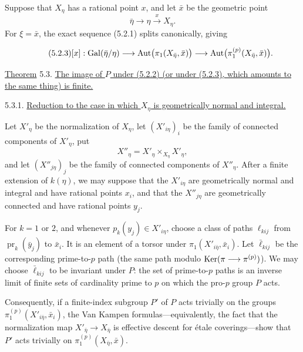 Suppose that $X_\eta$ has a rational point $x$, and let $\bar x$ be the
geometric point
\[
\bar\eta\longrightarrow\eta\xrightarrow{\ x\ }X_\eta.
\]
For $\xi=\bar x$, the exact sequence (5.2.1) splits canonically, giving


\begin{equation}\tag{5.2.3}
[x]:\operatorname{Gal}(\bar\eta/\eta)
\longrightarrow\operatorname{Aut}\bigl(\pi_1(X_{\bar\eta},\bar x)\bigr)
\longrightarrow\operatorname{Aut}\bigl(\pi_1^{(p)}(X_{\bar\eta},\bar x)\bigr).
\end{equation}

\underline{Theorem} 5.3. \underline{The image of $P$ under (5.2.2)
(or under (5.2.3), which amounts to the same thing) is finite.}

5.3.1. \underline{Reduction to the case in which $X_\eta$ is
geometrically normal and integral.}

Let $X'_\eta$ be the normalization of $X_\eta$, let
$(X'_{i\eta})_i$ be the family of connected components of $X'_\eta$,
put
\[
X''_\eta=X'_\eta\times_{X_\eta}X'_\eta,
\]
and let $(X''_{j\eta})_j$ be the family of connected components of
$X''_\eta$. After a finite extension of $k(\eta)$, we may suppose that
the $X'_{i\eta}$ are geometrically normal and integral and have rational
points $x_i$, and that the $X''_{j\eta}$ are geometrically connected and
have rational points $y_j$.

For $k=1$ or $2$, and whenever $p_k(y_j)\in X'_{i\eta}$, choose a class
of paths $\ell_{kij}$ from $\operatorname{pr}_k(\bar y_j)$ to $\bar x_i$.
It is an element of a torsor under
$\pi_1(X'_{i\bar\eta},\bar x_i)$. Let $\bar\ell_{kij}$ be the
corresponding prime-to-$p$ path (the same path modulo
$\operatorname{Ker}(\pi\longrightarrow\pi^{(p)})$). We may choose
$\bar\ell_{kij}$ to be invariant under $P$: the set of prime-to-$p$
paths is an inverse limit of finite sets of cardinality prime to $p$ on
which the pro-$p$ group $P$ acts.

Consequently, if a finite-index subgroup $P'$ of $P$ acts trivially on
the groups $\pi_1^{(p)}(X'_{i\bar\eta},\bar x_i)$, the Van Kampen
formulas---equivalently, the fact that the normalization map
$X'_{\bar\eta}\longrightarrow X_{\bar\eta}$ is effective descent for
\'{e}tale coverings---show that $P'$ acts trivially on
$\pi_1^{(p)}(X_{\bar\eta},\bar x)$.

